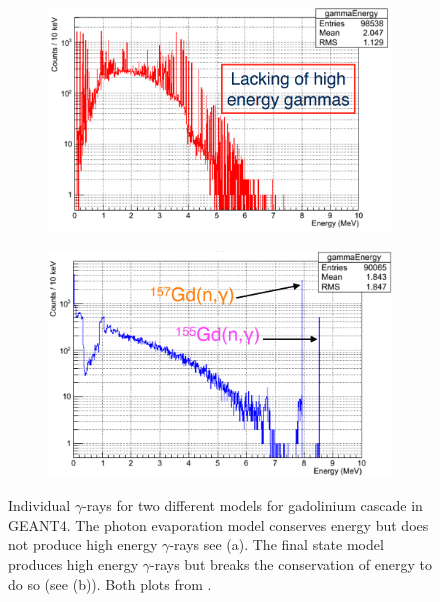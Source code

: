 \begin{figure}[!h]
\centering
\begin{subfigure}{.5\textwidth}
  \centering
  \includegraphics[width=\linewidth]{Chapter4/Figs/Raster/gadolinium/photonEvaporationGd.png}
  \captionsetup{width=.9\linewidth}
  \caption{}
  \label{subFig:differentGEANT4Models_photonEvaporationGd}
\end{subfigure}%
\begin{subfigure}{.5\textwidth}
  \centering
  \includegraphics[width=\linewidth]{Chapter4/Figs/Raster/gadolinium/FinalStateGd.png}
  \captionsetup{width=.9\linewidth}
  \caption{}
  \label{subFig:differentGEANT4Models_finalStateGd}
\end{subfigure}
\caption{Individual $\gamma$-rays for two different models for gadolinium cascade in GEANT4. The photon evaporation model conserves energy but does not produce high energy $\gamma$-rays see (a). The final state model produces high energy $\gamma$-rays but breaks the conservation of energy to do so (see (b)). Both plots from \cite{YuChen_2015}.}
\label{fig:differentGEANT4Models}
\end{figure}

